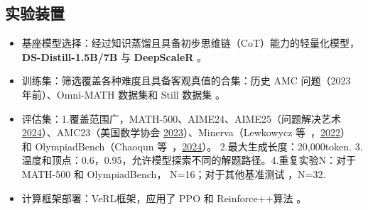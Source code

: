 \documentclass{article}
\begin{document}
\subsection{实验装置}
\begin{itemize}
    \item 基座模型选择：经过知识蒸馏且具备初步思维链（CoT）能力的轻量化模型， \textbf{DS-Distill-1.5B/7B} 与 \textbf{DeepScaleR} 。
    \item 训练集：筛选覆盖各种难度且具备客观真值的合集：历史 AMC 问题（2023 年前）、Omni-MATH 数据集和 Still 数据集 。
    \item 评估集：1.覆盖范围广，MATH-500、AIME24、AIME25（问题解决艺术 \href{https://ar5iv.labs.arxiv.org/html/2508.10293?_immersive_translate_auto_translate=1\#bib.bib2}{2024}）、AMC23（美国数学协会 \href{https://ar5iv.labs.arxiv.org/html/2508.10293?_immersive_translate_auto_translate=1\#bib.bib20}{2023}）、Minerva（Lewkowycz 等 ，\href{https://ar5iv.labs.arxiv.org/html/2508.10293?_immersive_translate_auto_translate=1\#bib.bib15}{2022}） 和 OlympiadBench（Chaoqun 等 ，\href{https://ar5iv.labs.arxiv.org/html/2508.10293?_immersive_translate_auto_translate=1\#bib.bib3}{2024}）。 2.最大生成长度：20,000token. 3.温度和顶点：0.6，0.95，允许模型探索不同的解题路径。4.重复实验N：对于 MATH-500 和 OlympiadBench， N=16；对于其他基准测试 ，N=32.
    \item 计算框架部署：VeRL框架，应用了 PPO 和 Reinforce++算法 。
\end{itemize}
\end{document}

